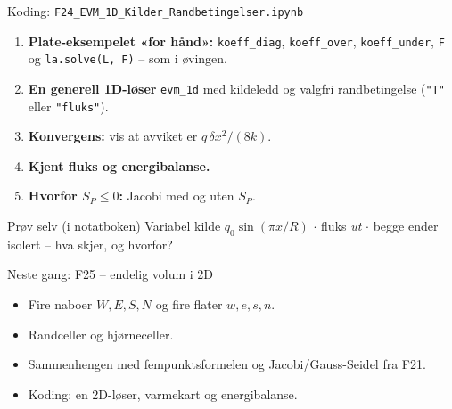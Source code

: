 \documentclass[11pt,aspectratio=169]{beamer}
\begin{document}
\begin{frame}{Koding: \texttt{F24\_EVM\_1D\_Kilder\_Randbetingelser.ipynb}}
\begin{enumerate}
\item \textbf{Plate-eksempelet «for hånd»:} \texttt{koeff\_diag}, \texttt{koeff\_over}, \texttt{koeff\_under}, \texttt{F} og \texttt{la.solve(L, F)} -- som i øvingen.
\item \textbf{En generell 1D-løser} \texttt{evm\_1d} med kildeledd og valgfri randbetingelse (\texttt{"T"} eller \texttt{"fluks"}).
\item \textbf{Konvergens:} vis at avviket er $q\,\delta x^2/(8k)$.
\item \textbf{Kjent fluks og energibalanse.}
\item \textbf{Hvorfor $S_P\le0$:} Jacobi med og uten $S_P$.
\end{enumerate}
\begin{remb}{Prøv selv (i notatboken)}
Variabel kilde $q_0\sin(\pi x/R)$ \;$\cdot$\; fluks \emph{ut} \;$\cdot$\; begge ender isolert -- hva skjer, og hvorfor?
\end{remb}
\end{frame}

\begin{frame}{Neste gang: F25 -- endelig volum i 2D}
\begin{nestefb}
\begin{itemize}
\item Fire naboer $W,E,S,N$ og fire flater $w,e,s,n$.
\item Randceller og hjørneceller.
\item Sammenhengen med fempunktsformelen og Jacobi/Gauss-Seidel fra F21.
\item Koding: en 2D-løser, varmekart og energibalanse.
\end{itemize}
\end{nestefb}
\end{frame}
\end{document}
